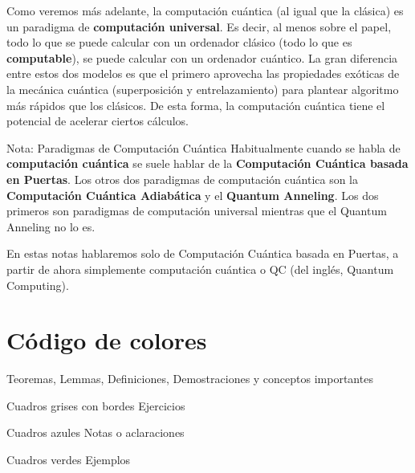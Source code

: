 \documentclass[a4paper,11pt]{book} %
\numberwithin{equation}{chapter}
\begin{document}
Como veremos más adelante, la computación cuántica (al igual que la clásica) es un paradigma de \textbf{computación universal}. Es decir, al menos sobre el papel, todo lo que se puede calcular con un ordenador clásico (todo lo que es \textbf{computable}), se puede calcular con un ordenador cuántico. La gran diferencia entre estos dos modelos es que el primero aprovecha las propiedades exóticas de la mecánica cuántica (superposición y entrelazamiento) para plantear algoritmo más rápidos que los clásicos. De esta forma, la computación cuántica tiene el potencial de acelerar ciertos cálculos. 


	\begin{mybox_blue}{Nota: Paradigmas de Computación Cuántica}
	Habitualmente cuando se habla de \textbf{computación cuántica} se suele hablar de la \textbf{Computación 
	Cuántica basada en Puertas}. Los otros dos paradigmas de computación cuántica son la \textbf{Computación
	Cuántica Adiabática} y el \textbf{Quantum Anneling}. Los dos primeros son paradigmas de computación
	universal mientras que el Quantum Anneling no lo es. \vspace{0.3cm}
	
	En estas notas hablaremos solo de Computación Cuántica basada en Puertas, a partir de ahora simplemente
	computación cuántica o QC (del inglés, Quantum Computing).
	\end{mybox_blue}	




\newpage

\section*{Código de colores} %

\begin{mybox_gray2}{}
Teoremas, Lemmas, Definiciones, Demostraciones y conceptos importantes
\end{mybox_gray2}

\begin{mybox_gray}{Cuadros grises con bordes}
Ejercicios
\end{mybox_gray}

\begin{mybox_blue}{Cuadros azules}
Notas o aclaraciones
\end{mybox_blue}

\begin{mybox_green}{Cuadros verdes}
Ejemplos
\end{mybox_green}
\end{document}
